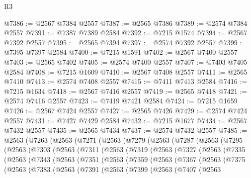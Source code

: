 \begin{lexlean}{R3}
\begin{coremodule}
@7386 := @2567 @7384 @2557
@7387 := @2565 @7386
@7389 := @2574 @7384 @2557
@7391 := @7387 @7389 @2584
@7392 := @7215 @1574
@7394 := @2567 @7392 @2557
@7395 := @2565 @7394
@7397 := @2574 @7392 @2557
@7399 := @7395 @7397 @2584
@7400 := @7215 @1591
@7402 := @2567 @7400 @2557
@7403 := @2565 @7402
@7405 := @2574 @7400 @2557
@7407 := @7403 @7405 @2584
@7408 := @7215 @1609
@7410 := @2567 @7408 @2557
@7411 := @2565 @7410
@7413 := @2574 @7408 @2557
@7415 := @7411 @7413 @2584
@7416 := @7215 @1634
@7418 := @2567 @7416 @2557
@7419 := @2565 @7418
@7421 := @2574 @7416 @2557
@7423 := @7419 @7421 @2584
@7424 := @7215 @1659
@7426 := @2567 @7424 @2557
@7427 := @2565 @7426
@7429 := @2574 @7424 @2557
@7431 := @7427 @7429 @2584
@7432 := @7215 @1677
@7434 := @2567 @7432 @2557
@7435 := @2565 @7434
@7437 := @2574 @7432 @2557
@7485 := @2563
    (@7263
      (@2563
        (@7271
          (@2563
            (@7279
              (@2563
                (@7287
                  (@2563
                    (@7295
                      (@2563
                        (@7303
                          (@2563
                            (@7311
                              (@2563
                                (@7319
                                  (@2563
                                    (@7327
                                      (@2563
                                        (@7335
                                          (@2563
                                            (@7343
                                              (@2563
                                                (@7351
                                                  (@2563
                                                    (@7359
                                                      (@2563
                                                        (@7367
                                                          (@2563
                                                            (@7375
                                                              (@2563
                                                                (@7383
                                                                  (@2563
                                                                    (@7391
                                                                      (@2563
                                                                        (@7399
                                                                          (@2563
                                                                            (@7407
                                                                              (@2563

\end{coremodule}
\end{lexlean}
